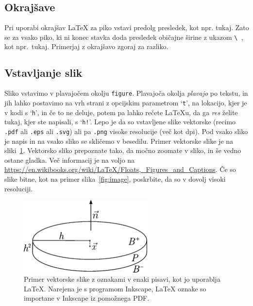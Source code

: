 \documentclass[isrm2, tisk]{fmfdelo}
\begin{document}
    \subsection{Okrajšave}
    Pri uporabi okrajšav \LaTeX{} za piko vstavi predolg presledek, kot npr. tukaj. Zato se za vsako
    piko, ki ni konec stavka doda presledek običajne širine z ukazom \verb*|\ |, kot npr.\ tukaj.
    Primerjaj z okrajšavo zgoraj za razliko.

    \subsection{Vstavljanje slik}
    Sliko vstavimo v plavajočem okolju \texttt{figure}. Plavajoča okolja \emph{plavajo} po tekstu, in
    jih lahko postavimo na vrh strani z opcijskim parametrom `\texttt{t}', na lokacijo, kjer je v kodi s
    `\texttt{h}', in če to ne deluje, potem pa lahko rečete \LaTeX u, da ga \emph{res} želite tukaj,
    kjer ste napisali, s `\texttt{h!}'. Lepo je da so vstavljene slike vektorske (recimo \texttt{.pdf}
    ali \texttt{.eps} ali \texttt{.svg}) ali pa \texttt{.png} visoke resolucije (več kot
    \unit[300]{dpi}). Pod vsako sliko je napis in na vsako sliko se skličemo v besedilu. Primer
    vektorske slike je na sliki~\ref{fig:sample}. Vektorsko sliko prepoznate tako, da močno
    zoomate v sliko, in še vedno ostane gladka. Več informacij je na voljo na
    \url{https://en.wikibooks.org/wiki/LaTeX/Floats,_Figures_and_Captions}. Če so slike bitne, kot na
    primer slika~\ref{fig:image}, poskrbite, da so v dovolj visoki resoluciji.

    \begin{figure}[h]
        \centering
        \includegraphics[width=0.6\textwidth]{images/sample.pdf}
        \caption[Primer vektorske slike.]{Primer vektorske slike z oznakami v enaki pisavi, kot jo
        uporablja \LaTeX{}. Narejena je s programom Inkscape, \LaTeX{} oznake so importane v
        Inkscape iz pomožnega PDF.}
        \label{fig:sample}
    \end{figure}
\end{document}
